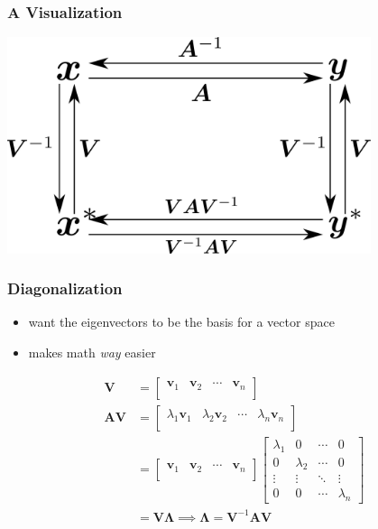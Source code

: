 \documentclass[aspectratio=169]{beamer}
\begin{document}
\begin{frame}
    \frametitle{A Visualization}

    \begin{center}
        \includegraphics[width=0.8\textwidth]{change-of-basis.png}
    \end{center}
\end{frame}

\begin{frame}
    \frametitle{Diagonalization}

    \begin{itemize}
        \item want the eigenvectors to be the basis for a vector space
        \item makes math \emph{way} easier
    \end{itemize} \pause
    \begin{align}
        \bm{V} &=
        \begin{bmatrix}
            \bm{v}_1 & \bm{v}_2 & \cdots & \bm{v}_n \\
        \end{bmatrix} \\
        \bm{AV} &=
        \begin{bmatrix}
            \lambda_1 \bm{v}_1 & \lambda_2 \bm{v}_2 & \cdots & \lambda_n \bm{v}_n \\
        \end{bmatrix} \\
        &=
        \begin{bmatrix}
            \bm{v}_1 & \bm{v}_2 & \cdots & \bm{v}_n \\
        \end{bmatrix}
        \begin{bmatrix}
            \lambda_1 & 0 & \cdots & 0 \\
            0 & \lambda_2 & \cdots & 0 \\
            \vdots & \vdots & \ddots & \vdots \\
            0 & 0 & \cdots & \lambda_n
        \end{bmatrix} \\
        &= \bm{V \Lambda} \implies \bm{\Lambda} = \bm{V}^{-1} \bm{AV}
    \end{align}
\end{frame}
\end{document}
